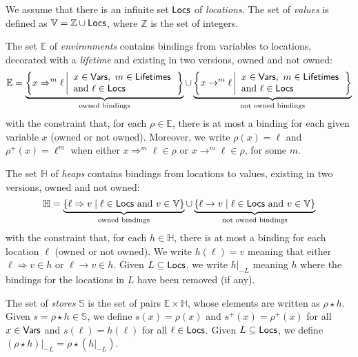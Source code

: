 \begin{definition}
  We assume that there is an infinite set $\mathsf{Locs}$ of \emph{locations}.
  The set of \emph{values} is defined as $\mathbb{V}=\mathbb{Z}\cup\mathsf{Locs}$,
  where $\mathbb{Z}$ is the set of integers.

  The set $\mathbb{E}$
  of \emph{environments} contains bindings from variables to locations,
  decorated with a \emph{lifetime} and existing in two versions, owned
  and not owned:
  \[
  \mathbb{E}=
  \underbrace{\left\{x\Rightarrow^m\ell\left|\begin{array}{l}
  x\in\mathsf{Vars},\ m\in\mathsf{Lifetimes}\\
  \text{and }\ell\in\mathsf{Locs}
  \end{array}\right.\right\}}_{\text{owned bindings}}
  \cup
  \underbrace{\left\{x\rightarrow^m\ell\left|\begin{array}{l}
  x\in\mathsf{Vars},\ m\in\mathsf{Lifetimes}\\
  \text{and }\ell\in\mathsf{Locs}
  \end{array}\right.\right\}}_{\text{not owned bindings}}
  \]
  with the constraint that, for each $\rho\in\mathbb{E}$, there is at most a binding for each
  given variable $x$ (owned or not owned). Moreover, we write $\rho(x)=\ell$ and
  $\rho^+(x)=\ell^m$ when
  either $x\Rightarrow^m\ell\in\rho$ or $x\rightarrow^m\ell\in\rho$, for some $m$.

  The set $\mathbb{H}$ of \emph{heaps} contains bindings from locations to values,
  existing in two versions, owned and not owned:
  \[
  \mathbb{H}=
  \underbrace{\{\ell\Rightarrow v\mid\ell\in\mathsf{Locs}\text{ and }v\in\mathbb{V}\}}_{\text{owned bindings}}
  \cup
  \underbrace{\{\ell\rightarrow v\mid\ell\in\mathsf{Locs}\text{ and }v\in\mathbb{V}\}}_{\text{not owned bindings}}
  \]
  with the constraint that, for each $h\in\mathbb{H}$, there is at most a binding for each
  location $\ell$ (owned or not owned). We write $h(\ell)=v$ meaning that
  either $\ell\Rightarrow v\in h$ or $\ell\rightarrow v\in h$. Given $L\subseteq\mathsf{Locs}$,
  we write $h|_{-L}$ meaning $h$ where the bindings for the locations in $L$
  have been removed (if any).

  The set of \emph{stores} $\mathbb{S}$ is the set of pairs
  $\mathbb{E}\times\mathbb{H}$, whose elements are written as $\rho\star h$.
  Given $s=\rho\star h\in\mathbb{S}$, we define $s(x)=\rho(x)$
  and $s^+(x)=\rho^+(x)$ for all
  $x\in\mathsf{Vars}$ and $s(\ell)=h(\ell)$ for all $\ell\in\mathsf{Locs}$.
  Given $L\subseteq\mathsf{Locs}$, we define $(\rho\star h)|_{-L}=\rho\star(h|_{-L})$.
\end{definition}

